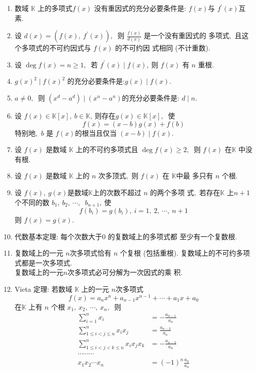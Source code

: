 \begin{enumerate}
		\item 数域 $ \mathbb{K} $ 上的多项式$  f(x) $ 没有重因式的充分必要条件是:  $f(x)  $与 $ f^{\prime}(x)  $互素.
		\item 设  $d(x)=\left(f(x),\  f^{\prime}(x)\right) ,\ $ 则  $\frac{f(x)}{d(x)} $ 是一个没有重因式的 多项式,\  且这个多项式的不可约因式与  $f(x) $ 的不可约因 式相同 (不计重数).
		\item 设  $\operatorname{deg} f(x)=n \geqslant 1 ,\ $ 若  $f^{\prime}(x) \mid f(x) ,\  $则  $f(x) $ 有 $ n$  重根.
		\item$ g(x)^{2} \mid f(x)^{2} $ 的充分必要条件是:$  g(x) \mid f(x) .$
		\item  $a \neq 0 ,\ $ 则 $ \left(x^{d}-a^{d}\right) \mid\left(x^{n}-a^{n}\right)  $的充分必要条件是:  $d \mid n .$
		\item 设  $f(x) \in \mathbb{K}[x],\  b \in \mathbb{K} ,\  $则存在$  g(x) \in \mathbb{K}[x] ,\ $ 使
		$$f(x)=(x-b) g(x)+f(b)$$
		特别地,\  $ b$  是 $ f(x)  $的根当且仅当 $ (x-b) \mid f(x) .$
		\item 设 $ f(x)$  是数域 $ \mathbb{K} $ 上的不可约多项式且  $\operatorname{deg} f(x) \geqslant 2 ,\ $ 则 $ f(x)$  在$  \mathbb{K}$  中没有根.
		\item 设 $ f(x) $ 是数域 $ \mathbb{K} $ 上的  $n$  次多顶式,\  则 $ f(x) $ 在 $ \mathbb{K}  $中最 多只有 $ n $ 个根.
		\item 设  $f(x),\  g(x)  $是数域$  \mathbb{K}  $上的次数不超过 $ n $ 的两个多项 式,\  若存在$  \mathbb{K}$  上$  n+1  $个不同的数 $ b_{1},\  b_{2},\  \cdots,\ $ $ b_{n+1} ,\  $使
		$$f\left(b_{i}\right)=g\left(b_{i}\right),\  i=1,\ 2,\  \cdots,\  n+1$$
		则 $ f(x)=g(x) .$
		\item 代数基本定理: 每个次数大于$ 0$ 的复数域上的多项式都 至少有一个复数根.
		\item 复数域上的一元  $n  $次多项式恰有  $n$  个复根 (包括重根). 复数域上的不可约多项式都是一次多项式.\\
		复数域上的一元$  n  $次多项式必可分解为一次因式的乘 积.
		
		\item Vieta 定理: 若数域  $\mathbb{K}$  上的一元 $ n  $次多项式
		$$f(x)=a_{n} x^{n}+a_{n-1} x^{n-1}+\cdots+a_{1} x+a_{0}$$
		在$ \mathbb{K} $ 上有  $n $ 个根  $x_{1},\  x_{2},\  \cdots,\  x_{n} ,\ $ 则
		$$\begin{aligned}
			\sum_{i=1}^{n} x_{i} &=-\frac{a_{n-1}}{a_{n}} \\
			\sum_{1 \leqslant i<j \leqslant n}^{n} x_{i} x_{j} &=\frac{a_{n-2}}{a_{n}} \\
			\sum_{1 \leqslant i<j<k \leqslant n}^{n} x_{i} x_{j} x_{k} &=-\frac{a_{n-3}}{a_{n}} \\
			\cdots \cdots \cdots \\
			x_{1} x_{2} \cdots x_{n} &=(-1)^{n} \frac{a_{0}}{a_{n}}
		\end{aligned}$$
		

\end{enumerate}
